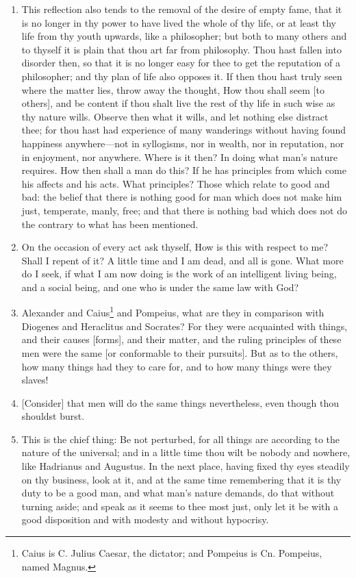 \begin{enumerate}
\item This reflection also tends to the removal of the desire of empty fame, that it is no longer in thy power to have lived the whole of thy life, or at least thy life from thy youth upwards, like a philosopher; but both to many others and to thyself it is plain that thou art far from philosophy. Thou hast fallen into disorder then, so that it is no longer easy for thee to get the reputation of a philosopher; and thy plan of life also opposes it. If then thou hast truly seen where the matter lies, throw away the thought, How thou shall seem [{\clarify to others}], and be content if thou shalt live the rest of thy life in such wise as thy nature wills. Observe then what it wills, and let nothing else distract thee; for thou hast had experience of many wanderings without having found happiness anywhere—not in syllogisms, nor in wealth, nor in reputation, nor in enjoyment, nor anywhere. Where is it then? In doing what man's nature requires. How then shall a man do this? If he has principles from which come his affects and his acts. What principles? Those which relate to good and bad: the belief that there is nothing good for man which does not make him just, temperate, manly, free; and that there is nothing bad which does not do the contrary to what has been mentioned.

\item On the occasion of every act ask thyself, How is this with respect to me? Shall I repent of it? A little time and I am dead, and all is gone. What more do I seek, if what I am now doing is the work of an intelligent living being, and a social being, and one who is under the same law with God?

\item Alexander and Caius\footnote{Caius is C. Julius Caesar, the dictator; and Pompeius is Cn. Pompeius, named Magnus.} and Pompeius, what are they in comparison with Diogenes and Heraclitus and Socrates? For they were acquainted with things, and their causes [{\clarify forms}], and their matter, and the ruling principles of these men were the same [{\clarify or conformable to their pursuits}]. But as to the others, how many things had they to care for, and to how many things were they slaves!

\item {[{\clarify Consider}]} that men will do the same things nevertheless, even though thou shouldst burst.

\item This is the chief thing: Be not perturbed, for all things are according to the nature of the universal; and in a little time thou wilt be nobody and nowhere, like Hadrianus and Augustus. In the next place, having fixed thy eyes steadily on thy business, look at it, and at the same time remembering that it is thy duty to be a good man, and what man's nature demands, do that without turning aside; and speak as it seems to thee most just, only let it be with a good disposition and with modesty and without hypocrisy.


\end{enumerate}
